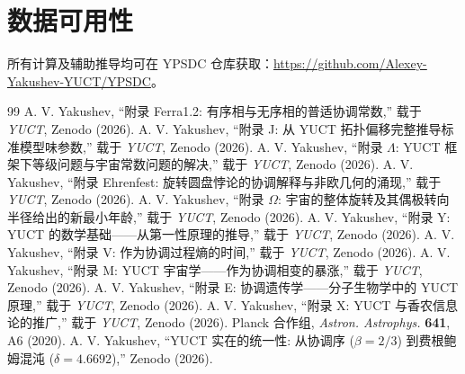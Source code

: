 \documentclass[12pt,a4paper]{article}
\begin{document}
	\section*{数据可用性}
	所有计算及辅助推导均可在 YPSDC 仓库获取：\url{https://github.com/Alexey-Yakushev-YUCT/YPSDC}。
	
	\begin{thebibliography}{99}
		 A. V. Yakushev, ``附录 Ferra1.2: 有序相与无序相的普适协调常数,'' 载于 \emph{YUCT}, Zenodo (2026).
		 A. V. Yakushev, ``附录 J: 从 YUCT 拓扑偏移完整推导标准模型味参数,'' 载于 \emph{YUCT}, Zenodo (2026).
		 A. V. Yakushev, ``附录 \(\Lambda\): YUCT 框架下等级问题与宇宙常数问题的解决,'' 载于 \emph{YUCT}, Zenodo (2026).
		 A. V. Yakushev, ``附录 Ehrenfest: 旋转圆盘悖论的协调解释与非欧几何的涌现,'' 载于 \emph{YUCT}, Zenodo (2026).
		 A. V. Yakushev, ``附录 \(\Omega\): 宇宙的整体旋转及其偶极转向半径给出的新最小年龄,'' 载于 \emph{YUCT}, Zenodo (2026).
		 A. V. Yakushev, ``附录 Y: YUCT 的数学基础——从第一性原理的推导,'' 载于 \emph{YUCT}, Zenodo (2026).
		 A. V. Yakushev, ``附录 V: 作为协调过程熵的时间,'' 载于 \emph{YUCT}, Zenodo (2026).
		 A. V. Yakushev, ``附录 M: YUCT 宇宙学——作为协调相变的暴涨,'' 载于 \emph{YUCT}, Zenodo (2026).
		 A. V. Yakushev, ``附录 E: 协调遗传学——分子生物学中的 YUCT 原理,'' 载于 \emph{YUCT}, Zenodo (2026).
		 A. V. Yakushev, ``附录 X: YUCT 与香农信息论的推广,'' 载于 \emph{YUCT}, Zenodo (2026).
		 Planck 合作组, \emph{Astron. Astrophys.} \textbf{641}, A6 (2020).
		 A. V. Yakushev, ``YUCT 实在的统一性: 从协调序 (\(\beta = 2/3\)) 到费根鲍姆混沌 (\(\delta = 4.6692\)),'' Zenodo (2026).
	\end{thebibliography}
	
\end{document}
